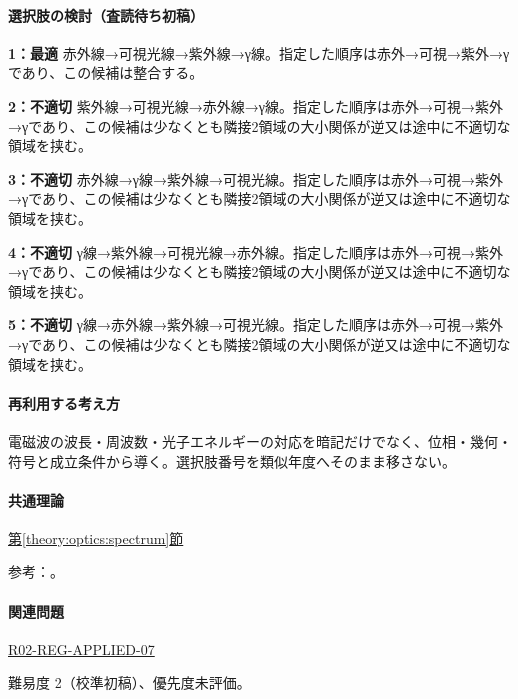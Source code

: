 \paragraph{選択肢の検討（査読待ち初稿）}\mbox{}\par

\noindent\textbf{1：最適} 赤外線→可視光線→紫外線→γ線。指定した順序は赤外→可視→紫外→γであり、この候補は整合する。\par

\noindent\textbf{2：不適切} 紫外線→可視光線→赤外線→γ線。指定した順序は赤外→可視→紫外→γであり、この候補は少なくとも隣接2領域の大小関係が逆又は途中に不適切な領域を挟む。\par

\noindent\textbf{3：不適切} 赤外線→γ線→紫外線→可視光線。指定した順序は赤外→可視→紫外→γであり、この候補は少なくとも隣接2領域の大小関係が逆又は途中に不適切な領域を挟む。\par

\noindent\textbf{4：不適切} γ線→紫外線→可視光線→赤外線。指定した順序は赤外→可視→紫外→γであり、この候補は少なくとも隣接2領域の大小関係が逆又は途中に不適切な領域を挟む。\par

\noindent\textbf{5：不適切} γ線→赤外線→紫外線→可視光線。指定した順序は赤外→可視→紫外→γであり、この候補は少なくとも隣接2領域の大小関係が逆又は途中に不適切な領域を挟む。\par

\paragraph{再利用する考え方} 電磁波の波長・周波数・光子エネルギーの対応を暗記だけでなく、位相・幾何・符号と成立条件から導く。選択肢番号を類似年度へそのまま移さない。

\paragraph{共通理論} \hyperref[theory:optics:spectrum]{第\ref*{theory:optics:spectrum}節}

\par 参考：\cite{os_spectrum}。

\paragraph{関連問題} \hyperref[q:r02-reg-applied-07]{R02-REG-APPLIED-07}

\par 難易度 2（校準初稿）、優先度未評価。

